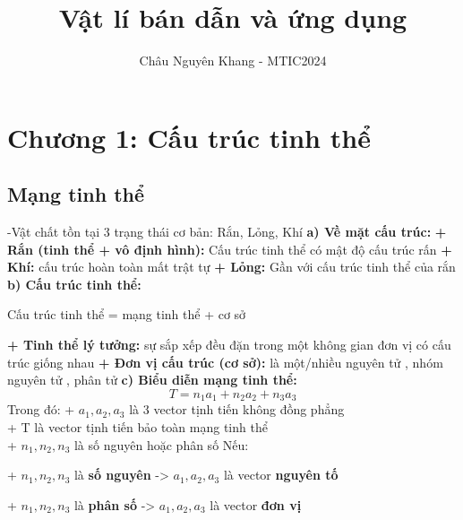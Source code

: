 \documentclass[12pt]{article}
\title{Vật lí bán dẫn và ứng dụng}
\author{Châu Nguyên Khang - MTIC2024}
\begin{document}
\setlength{\parindent}{10pt}
\maketitle
\newpage
\section{Chương 1: Cấu trúc tinh thể}
\subsection{Mạng tinh thể}
-Vật chất tồn tại 3 trạng thái cơ bản: Rắn, Lỏng, Khí
    \newline
    \textbf{a) Về mặt cấu trúc:}
    \newline
    \begingroup
    \indent\textbf{+ Rắn (tinh thể + vô định hình):} Cấu trúc tinh thể có mật độ cấu trúc rấn
    \newline
    \indent\textbf{+ Khí:} cấu trúc hoàn toàn mất trật tự
    \newline
    \indent\textbf{+ Lỏng:} Gần với cấu trúc tinh thể của rắn
    \endgroup
    \newline
    \textbf{b) Cấu trúc tinh thể:}
    \begingroup
        \begin{center}
            Cấu trúc tinh thể = mạng tinh thể + cơ sở
        \end{center}
    \endgroup
    \begingroup
    \indent\textbf{+ Tinh thể lý tưởng: } sự sắp xếp đều đặn trong một không gian đơn vị có cấu trúc giống nhau
    \newline
    \indent\textbf{+ Đơn vị cấu trúc (cơ sở): } là một/nhiều nguyên tử , nhóm nguyên tử , phân tử
    \endgroup
    \newline
    \textbf{c) Biểu diễn mạng tinh thể: }
    \newline
    \begingroup
    \newline
    \begin{equation}
        T = n_1a_1 + n_2a_2 + n_3a_3
    \end{equation}
    \indent Trong đó: 
    \newline
    \indent + \(a_1, a_2, a_3\) là 3 vector tịnh tiến không đồng phẳng \\
    \indent + T là vector tịnh tiến bảo toàn mạng tinh thể \\
    \indent + \(n_1, n_2, n_3\) là số nguyên hoặc phân số
    \newline
    \indent Nếu:

    \indent + \(n_1, n_2, n_3\) là \textbf{số nguyên} -> \(a_1, a_2, a_3\) là vector \textbf{nguyên tố}
    
    \indent + \(n_1, n_2, n_3\) là \textbf{phân số} -> \(a_1, a_2, a_3\) là vector \textbf{đơn vị}
    \endgroup
\end{document}

